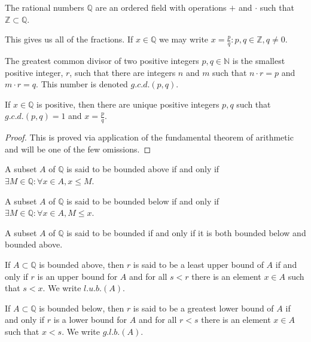             \begin{definition}
            The rational numbers $\mathbb{Q}$ are an ordered field with operations $+$ and $\cdot$ such that $\mathbb{Z}\subset \mathbb{Q}$.
            \end{definition}
            This gives us all of the fractions. If $x\in \mathbb{Q}$ we may write $x= \frac{p}{q}:p,q\in \mathbb{Z}, q\ne 0$.
            \begin{definition}
            The greatest common divisor of two positive integers
            $p,q\in\mathbb{N}$ is the smallest positive integer, $r$, such
            that there are integers $n$ and $m$ such that $n\cdot{r}=p$ and
            $m\cdot{r}=q$. This number is denoted $g.c.d.(p,q)$.
            \end{definition}
            \begin{theorem}
            If $x\in \mathbb{Q}$ is positive, then there are unique positive
            integers $p, q$ such that $g.c.d.(p,q)=1$ and $x=\frac{p}{q}$.
            \end{theorem}
            \begin{proof}
            This is proved via application of the fundamental theorem of arithmetic and will be one of the few omissions.
            \end{proof}
            \begin{definition}
            A subset $A$ of $\mathbb{Q}$ is said to be bounded above if and only if $\exists M\in \mathbb{Q}: \forall x\in A,x \leq M$.
            \end{definition}
            \begin{definition}
            A subset $A$ of $\mathbb{Q}$ is said to be bounded below if and only if $\exists M\in \mathbb{Q}:\forall x\in A,M\leq x$. 
            \end{definition}
            \begin{definition}
            A subset $A$ of $\mathbb{Q}$ is said to be bounded if and only if it is both bounded below and bounded above.
            \end{definition}
            \begin{definition}
            If $A\subset \mathbb{Q}$ is bounded above, then $r$ is said to be a least upper bound of $A$ if and only if $r$ is an upper bound for $A$ and for all $s<r$ there is an element $x\in A$ such that $s<x$. We write $l.u.b.(A)$.
            \end{definition}
            \begin{definition}
            If $A\subset \mathbb{Q}$ is bounded below, then $r$ is said to be a greatest lower bound of $A$ if and only if $r$ is a lower bound for $A$ and for all $r<s$ there is an element $x\in A$ such that $x<s$. We write $g.l.b.(A)$.
            \end{definition}
